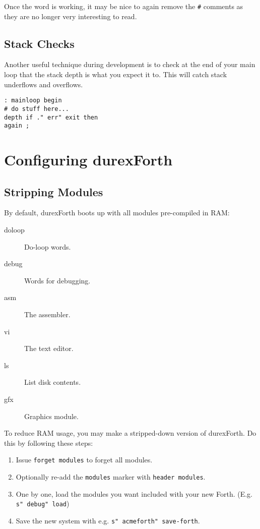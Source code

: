 Once the word is working, it may be nice to again remove the \texttt{\#} comments as
they are no longer very interesting to read.

\subsection{Stack Checks}

Another useful technique during development is to check at the end of your main loop
that the stack depth is what you expect it to. This will catch stack underflows
and overflows.

\begin{verbatim}
: mainloop begin
# do stuff here...
depth if ." err" exit then
again ;
\end{verbatim}

\section{Configuring durexForth}

\subsection{Stripping Modules}

By default, durexForth boots up with all modules pre-compiled in RAM:

\begin{description}
\item[doloop] Do-loop words.
\item[debug] Words for debugging.
\item[asm] The assembler.
\item[vi] The text editor.
\item[ls] List disk contents.
\item[gfx] Graphics module.
\end{description}

To reduce RAM usage, you may make a stripped-down version of durexForth. Do this by following these steps:

\begin{enumerate}
\item Issue \texttt{forget modules} to forget all modules.
\item Optionally re-add the \texttt{modules} marker with \texttt{header modules}.
\item One by one, load the modules you want included with your new Forth. (E.g. \texttt{s" debug" load})
\item Save the new system with e.g. \texttt{s" acmeforth" save-forth}.
\end{enumerate}

